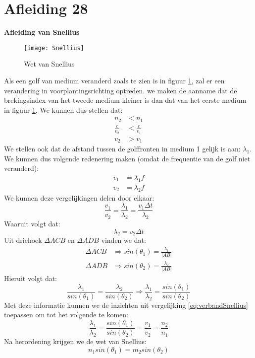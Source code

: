 \documentclass[a4paper,kul]{kulakarticle} %
\begin{document}
\section{Afleiding 28}
\textbf{Afleiding van Snellius}
\begin{figure}[h]
	\centering
	\texttt{[image: Snellius]}
	\caption[Snellius]{Wet van Snellius}
	\label{fig:snellius}
\end{figure}
Als een golf van medium veranderd zoals te zien is in figuur \ref{fig:snellius}, zal er een verandering in voorplantingsrichting optreden. we maken de aanname dat de brekingsindex van het tweede medium kleiner is dan dat van het eerste medium in figuur \ref{fig:snellius}. We kunnen dus stellen dat:
\begin{align*}
	n_2&<n_1\\
	\frac{c}{v_2}&<\frac{c}{v_1}\\
	v_2&>v_1
\end{align*}
We stellen ook dat de afstand tussen de golffronten in medium 1 gelijk is aan: $\lambda_1$. We kunnen dus volgende redenering maken (omdat de frequentie van de golf niet veranderd):
\begin{align*}
	v_1&=\lambda_1f\\
	v_2&=\lambda_2f
\end{align*}
We kunnen deze vergelijkingen delen door elkaar:
\begin{equation}
	\label{eq:verbandSnellius}
	\frac{v_1}{v_2}=\frac{\lambda_1}{\lambda_2}=\frac{v_1\Delta t}{\lambda_2}
\end{equation}
Waaruit volgt dat:
\begin{equation*}
	\lambda_2=v_2\Delta t
\end{equation*}
Uit driehoek $\Delta ACB$ en $\Delta ADB$ vinden we dat:
\begin{align*}
	\Delta ACB&\Rightarrow sin(\theta_1) = \frac{\lambda_1}{|AB|}\\
	\Delta ADB&\Rightarrow sin(\theta_2) = \frac{\lambda_2}{|AB|}
\end{align*}
Hieruit volgt dat:
\begin{equation*}
	\frac{\lambda_1}{sin(\theta_1)}= \frac{\lambda_2}{sin(\theta_2)} \Rightarrow \frac{\lambda_1}{\lambda_2}=\frac{sin(\theta_1)}{sin(\theta_2)}
\end{equation*}
Met deze informatie kunnen we de inzichten uit vergelijking \ref{eq:verbandSnellius} toepassen om tot het volgende te komen:
\begin{equation*}
	\frac{\lambda_1}{\lambda_2}=\frac{sin(\theta_1)}{sin(\theta_2)}=\frac{v_1}{v_2}= \frac{n_2}{n_1}
\end{equation*}
Na herordening krijgen we de wet van Snellius:
\begin{equation}
	n_1sin(\theta_1)=m_2sin(\theta_2)
\end{equation}
\newpage
\end{document}
